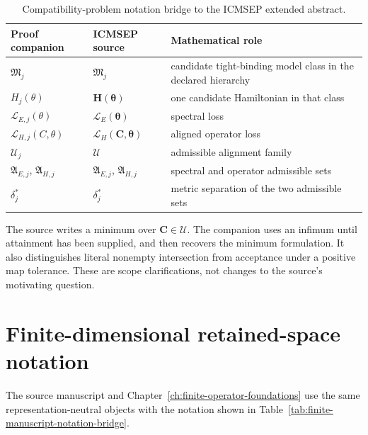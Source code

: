 \begin{table}[ht]
\centering
\small
\begin{tabularx}{\textwidth}{@{}l Y Y@{}}
\toprule
Proof companion & ICMSEP source & Mathematical role \\
\midrule
$\mathfrak M_j$
  & $\mathfrak M_j$
  & candidate tight-binding model class in the declared hierarchy \\
$H_j(\theta)$
  & $\mathbf H(\boldsymbol\theta)$
  & one candidate Hamiltonian in that class \\
$\mathcal L_{E,j}(\theta)$
  & $\mathcal L_E(\boldsymbol\theta)$
  & spectral loss \\
$\mathcal L_{H,j}(C,\theta)$
  & $\mathcal L_H(\mathbf C,\boldsymbol\theta)$
  & aligned operator loss \\
$\mathcal U_j$
  & $\mathcal U$
  & admissible alignment family \\
$\mathfrak A_{E,j}$, $\mathfrak A_{H,j}$
  & $\mathfrak A_{E,j}$, $\mathfrak A_{H,j}$
  & spectral and operator admissible sets \\
$\delta_j^*$
  & $\delta_j^*$
  & metric separation of the two admissible sets \\
\bottomrule
\end{tabularx}
\caption{Compatibility-problem notation bridge to the ICMSEP extended abstract.}
\label{tab:icmsep-compatibility-bridge}
\end{table}

The source writes a minimum over $\mathbf C\in\mathcal U$.  The companion uses an
infimum until attainment has been supplied, and then recovers the minimum formulation.
It also distinguishes literal nonempty intersection from acceptance under a positive
map tolerance.  These are scope clarifications, not changes to the source's motivating
question.

\section{Finite-dimensional retained-space notation}

The source manuscript and Chapter~\ref{ch:finite-operator-foundations} use the same
representation-neutral objects with the notation shown in
Table~\ref{tab:finite-manuscript-notation-bridge}.

